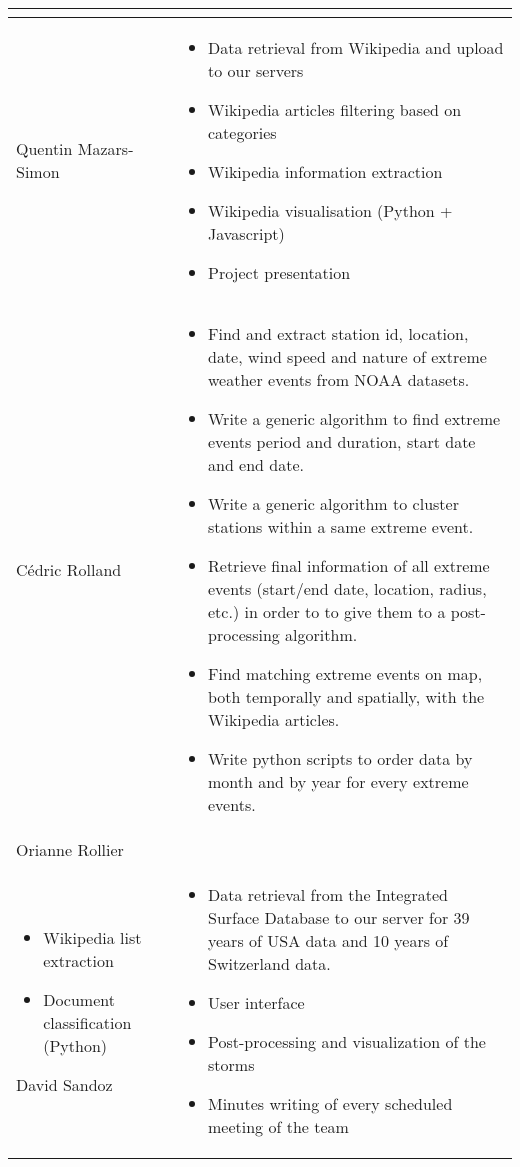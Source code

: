 \begin{longtable}{|l|p{10.5cm}|}
\begin{itemize}
\end{itemize}\\
\hline
Quentin Mazars-Simon & \begin{itemize}
	\item Data retrieval from Wikipedia and upload to our servers
	\item Wikipedia articles filtering based on categories
	\item Wikipedia information extraction
	\item Wikipedia visualisation (Python + Javascript)
	\item Project presentation
\end{itemize}\\
\hline
Cédric Rolland &  \begin{itemize}
	\item Find and extract station id, location, date, wind speed and nature of extreme weather events from NOAA datasets.
	\item Write a generic algorithm to find extreme events period and duration, start date and end date.
	\item Write a generic algorithm to cluster stations within a same extreme event.
	\item Retrieve final information of all extreme events (start/end date, location, radius, etc.) in order to to give them to a post-processing algorithm.
	\item Find matching extreme events on map, both temporally and spatially, with the Wikipedia articles.
	\item Write python scripts to order data by month and by year for every extreme events.
\end{itemize}\\
\hline
Orianne Rollier & \\
\begin{itemize}
	\item Wikipedia list extraction
	\item Document classification (Python)
\end{itemize}
\hline
David Sandoz &
\begin{itemize}
	\item Data retrieval from the Integrated Surface Database to our server for 39 years of USA data and 10 years of Switzerland data.
	\item User interface
	\item Post-processing and visualization of the storms
	\item Minutes writing of every scheduled meeting of the team

\end{itemize}
\end{longtable}
